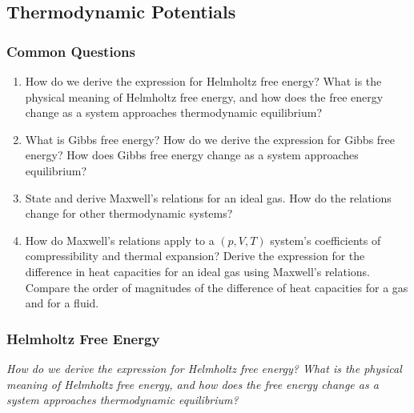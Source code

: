 \documentclass[11pt, a4paper]{article}
\begin{document}
\subsection{Thermodynamic Potentials}

\subsubsection{Common Questions}
\begin{enumerate}
    \item How do we derive the expression for Helmholtz free energy? What is the physical meaning of Helmholtz free energy, and how does the free energy change as a system approaches thermodynamic equilibrium?

    \item What is Gibbs free energy? How do we derive the expression for Gibbs free energy? How does Gibbs free energy change as a system approaches equilibrium?

    \item State and derive Maxwell's relations for an ideal gas. How do the relations change for other thermodynamic systems?

    \item How do Maxwell's relations apply to a $ (p, V, T) $ system's coefficients of compressibility and thermal expansion? Derive the expression for the difference in heat capacities for an ideal gas using Maxwell's relations. Compare the order of magnitudes of the  difference of heat capacities for a gas and for a fluid.

\end{enumerate}


\subsubsection{Helmholtz Free Energy}
\textit{How do we derive the expression for Helmholtz free energy? What is the physical meaning of Helmholtz free energy, and how does the free energy change as a system approaches thermodynamic equilibrium?}
\end{document}
